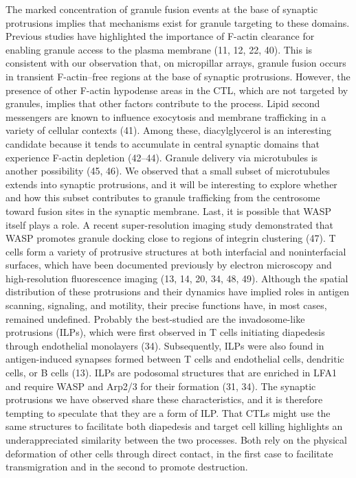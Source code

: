 The marked concentration of granule fusion events at the base of synaptic protrusions implies that mechanisms exist for granule targeting to these domains. Previous studies have highlighted the importance of F-actin clearance for enabling granule access to the plasma membrane (11, 12, 22, 40). This is consistent with our observation that, on micropillar arrays, granule fusion occurs in transient F-actin–free regions at the base of synaptic protrusions. However, the presence of other F-actin hypodense areas in the CTL, which are not targeted by granules, implies that other factors contribute to the process. Lipid second messengers are known to influence exocytosis and membrane trafficking in a variety of cellular contexts (41). Among these, diacylglycerol is an interesting candidate because it tends to accumulate in central synaptic domains that experience F-actin depletion (42–44). Granule delivery via microtubules is another possibility (45, 46). We observed that a small subset of microtubules extends into synaptic protrusions, and it will be interesting to explore whether and how this subset contributes to granule trafficking from the centrosome toward fusion sites in the synaptic membrane. Last, it is possible that WASP itself plays a role. A recent super-resolution imaging study demonstrated that WASP promotes granule docking close to regions of integrin clustering (47). T cells form a variety of protrusive structures at both interfacial and noninterfacial surfaces, which have been documented previously by electron microscopy and high-resolution fluorescence imaging (13, 14, 20, 34, 48, 49). Although the spatial distribution of these protrusions and their dynamics have implied roles in antigen scanning, signaling, and motility, their precise functions have, in most cases, remained undefined. Probably the best-studied are the invadosome-like protrusions (ILPs), which were first observed in T cells initiating diapedesis through endothelial monolayers (34). Subsequently, ILPs were also found in antigen-induced synapses formed between T cells and endothelial cells, dendritic cells, or B cells (13). ILPs are podosomal structures that are enriched in LFA1 and require WASP and Arp2/3 for their formation (31, 34). The synaptic protrusions we have observed share these characteristics, and it is therefore tempting to speculate that they are a form of ILP. That CTLs might use the same structures to facilitate both diapedesis and target cell killing highlights an underappreciated similarity between the two processes. Both rely on the physical deformation of other cells through direct contact, in the first case to facilitate transmigration and in the second to promote destruction.

